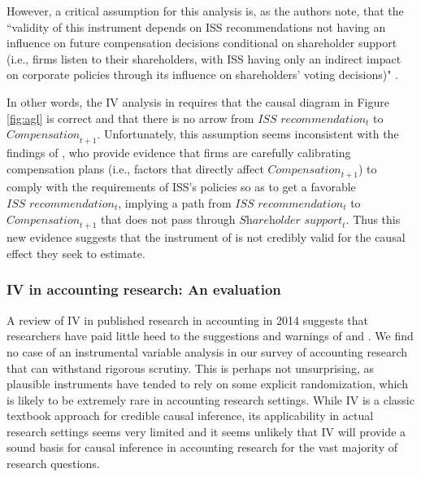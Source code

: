 \documentclass[11pt,reqno,titlepage]{amsart}
\begin{document}
\begin{doublespace}
However, a critical assumption for this analysis is, as the authors note, that the ``validity of this instrument depends on ISS recommendations not having an influence on future compensation decisions conditional on shareholder support (i.e., firms listen to their shareholders, with ISS having only an indirect impact on corporate policies through its influence on shareholders' voting decisions)" \citep[p.\,912]{Armstrong:2013io}.

In other words, the IV analysis in \citet[p.\,912]{Armstrong:2013io} requires that the causal diagram in Figure \ref{fig:agl} is correct and that there is no arrow from $\textit{ISS recommendation}_t$ to $\textit{Compensation}_{t+1}$. 
Unfortunately, this assumption seems inconsistent with the findings of \citet{Gow:2013aa}, who provide evidence that firms are carefully calibrating compensation plans (i.e., factors that directly affect $\textit{Compensation}_{t+1}$) to comply with the requirements of ISS's policies so as to get a favorable $\textit{ISS recommendation}_t$, implying a path from $\textit{ISS recommendation}_t$ to $\textit{Compensation}_{t+1}$ that does not pass through $\textit{Shareholder support}_{t}$.
Thus this new evidence suggests that the instrument of \citet[p.\,912]{Armstrong:2013io} is not credibly valid for the causal effect they seek to estimate.



\subsubsection{IV in accounting research: An evaluation}
A review of IV in published research in accounting in 2014 suggests that researchers have paid little heed to the suggestions and warnings of  \citet{Larcker:2010fq} and \citet{Roberts:2013cz}.
We find no case of an instrumental variable analysis in our survey of accounting research that can withstand rigorous scrutiny.
This is perhaps not unsurprising, as plausible instruments have tended to rely on some explicit randomization, which is likely to be extremely rare in accounting research settings.
While IV is a classic textbook approach for credible causal inference, its applicability in actual research settings seems very limited and it seems unlikely that IV will provide a sound basis for causal inference in accounting research for the vast majority of research questions.
 

\end{doublespace}
\end{document}
